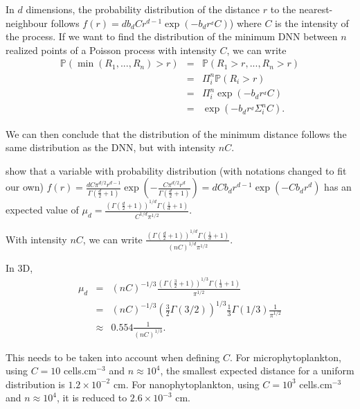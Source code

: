 \documentclass[english]{article}
\begin{document}
In $d$ dimensions, the probability distribution of the distance $r$
to the nearest-neighbour follows $f(r)=db_{d}Cr^{d-1}\exp(-b_{d}r^{_{d}}C)$)
where $C$ is the intensity of the process. If we want to find the
distribution of the minimum DNN between $n$ realized points of a
Poisson process with intensity $C$, we can write
\begin{equation}
\begin{array}{ccc}
\mathbb{P}(\min(R_{1},...,R_{n})>r) & = & \mathbb{P}(R_{1}>r,...,R_{n}>r)\\
 & = & \Pi_{i}^{n}\mathbb{P}(R_{i}>r)\\
 & = & \Pi_{i}^{n}\exp(-b_{d}r^{_{d}}C)\\
 & = & \exp(-b_{d}r^{_{d}}\Sigma_{i}^{n}C).
\end{array}
\end{equation}

We can then conclude that the distribution of the minimum distance
follows the same distribution as the DNN, but with intensity $nC$.

\medskip{}

\citet{clark_generalization_1979} show that a variable with probability
distribution (with notations changed to fit our own) $f(r)=\frac{dC\pi^{d/2}r^{d-1}}{\Gamma(\frac{d}{2}+1)}\exp(-\frac{C\pi^{d/2}r^{d}}{\Gamma(\frac{d}{2}+1)})=dCb_{d}r^{d-1}\exp(-Cb_{d}r^{d})$
has an expected value of $\mu_{d}=\frac{\left(\Gamma(\frac{d}{2}+1)\right)^{1/d}\Gamma(\frac{1}{d}+1)}{C^{1/d}\pi^{1/2}}$.

With intensity $nC$, we can write $\frac{\left(\Gamma(\frac{d}{2}+1)\right)^{1/d}\Gamma(\frac{1}{d}+1)}{(nC)^{1/d}\pi^{1/2}}$.

\medskip{}

In 3D, 
\begin{equation}
\begin{array}{ccc}
\mu_{d} & = & (nC)^{-1/3}\frac{\left(\Gamma(\frac{3}{2}+1)\right)^{1/3}\Gamma(\frac{1}{3}+1)}{\pi^{1/2}}\\
 & = & (nC)^{-1/3}\left(\frac{3}{2}\Gamma(3/2)\right)^{1/3}\frac{1}{3}\Gamma(1/3)\frac{1}{\pi^{1/2}}\\
 & \approx & 0.554\frac{1}{(nC)^{1/3}}.
\end{array}\label{eq:dnn_realization}
\end{equation}

This needs to be taken into account when defining $C$. For microphytoplankton,
using $C=10$ cells.cm$^{-3}$ and $n\approx10^{4}$, the smallest
expected distance for a uniform distribution is $1.2\times10^{-2}$
cm. For nanophytoplankton, using $C=10^{3}$ cells.cm$^{-3}$ and
$n\approx10^{4}$, it is reduced to $2.6\times10^{-3}$ cm. \medskip{}
\end{document}
